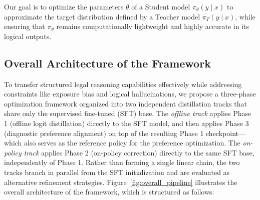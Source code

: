 Our goal is to optimize the parameters $\theta$ of a Student model $\pi_\theta(y \mid x)$ to approximate the target distribution defined by a Teacher model $\pi_T(y \mid x)$, while ensuring that $\pi_\theta$ remains computationally lightweight and highly accurate in its logical outputs.

\subsection{Overall Architecture of the Framework}

To transfer structured legal reasoning capabilities effectively while addressing constraints like exposure bias and logical hallucinations, we propose a three-phase optimization framework organized into two independent distillation tracks that share only the supervised fine-tuned (SFT) base. The \emph{offline track} applies Phase 1 (offline logit distillation) directly to the SFT model, and then applies Phase 3 (diagnostic preference alignment) on top of the resulting Phase 1 checkpoint---which also serves as the reference policy for the preference optimization. The \emph{on-policy track} applies Phase 2 (on-policy correction) directly to the same SFT base, independently of Phase 1. Rather than forming a single linear chain, the two tracks branch in parallel from the SFT initialization and are evaluated as alternative refinement strategies. Figure~\ref{fig:overall_pipeline} illustrates the overall architecture of the framework, which is structured as follows:

